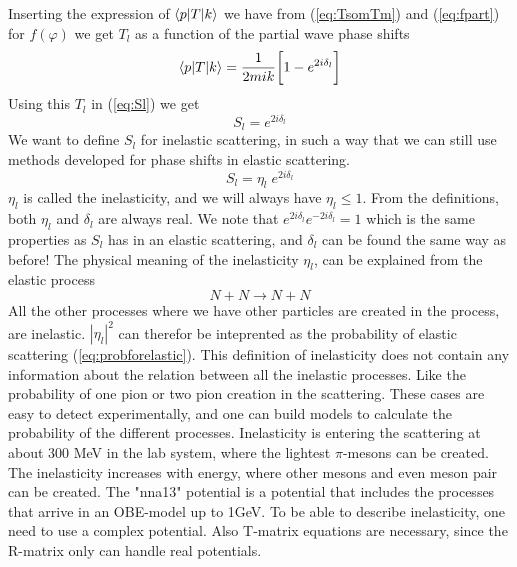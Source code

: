 Inserting the expression of $\langle{ p}|T|{ k}\rangle$ we have from  (\ref{eq:TsomTm}) and 
(\ref{eq:fpart}) for $f(\varphi)$ we get $T_l$ as a function of the partial wave phase shifts
%
\begin{equation}\label{eq:TsomTme} 
\braketm{{ p}}{T}{{ k}}=\inv{2mik}\bigg[1-e^{2i\delta_l}\bigg]
\end{equation}
%
Using this $T_l$ in (\ref{eq:Sl}) we get
%
\begin{equation}\label{eq:deltask}
S_l=e^{2i\delta_l}
\end{equation}
%
We want to define $S_l$ for inelastic scattering, 
in such a way that we can still use methods developed for phase shifts in elastic scattering.
%
%
\begin{equation}\label{eq:deltaski}
S_l=\eta_l\; e^{2i\delta_l}
\end{equation}
%
$\eta_l$ is called the inelasticity, and we will always have $\eta_l\le 1$.
From the definitions, both $\eta_l$ and $\delta_l$ are always real. 
We note that $ e^{2i\delta_l}e^{-2i\delta_l}=1$ which is the same properties as 
$S_l$ has in an elastic scattering, and $\delta_l$ can be found the same way as before! 
\nl
The physical meaning of the inelasticity $\eta_l$, can be explained from the elastic process
\begin{equation}\label{eq:probforelastic}
N+N\to N+N
\end{equation}
All the other processes where we have other particles are created in the process,
are inelastic. $|\eta_l|^2$ can therefor be inteprented as the
probability of elastic scattering (\ref{eq:probforelastic}). This definition of
inelasticity does not contain any information about the relation between all the inelastic processes. Like
the probability of one pion or two pion creation in the scattering. These cases are easy to detect experimentally, and
one can build models to calculate the probability of the different processes.  
\nl
Inelasticity is entering the scattering at about 300 MeV in the lab system, where the lightest $\pi$-mesons
can be created. The inelasticity increases with energy, where other mesons and even meson pair can be created.
The "nna13" potential is a potential that includes the processes that arrive in an OBE-model up to 1GeV.
To be able to describe inelasticity, one need to use a complex potential. Also T-matrix equations are necessary, since
the R-matrix only can handle real potentials.








